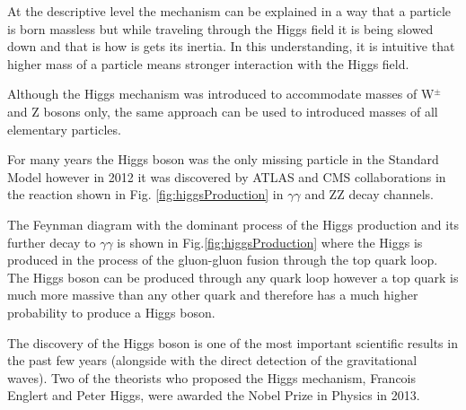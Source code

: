 At the descriptive level the mechanism can be explained in a way that a particle is born massless but while traveling through the Higgs field it is being slowed down and that is how is gets its inertia. In this understanding, it is intuitive that higher mass of a particle means stronger interaction with the Higgs field. 

Although the Higgs mechanism was introduced to accommodate masses of W$^\pm$ and Z bosons only, the same approach can be used to introduced masses of all elementary particles.

For many years the Higgs boson was the only missing particle in the Standard Model however in 2012 it was discovered by ATLAS and CMS collaborations in the reaction shown in Fig. \ref{fig:higgsProduction} in $\gamma\gamma$ and ZZ decay channels. 

The Feynman diagram with the dominant process of the Higgs production and its further decay to $\gamma\gamma$ is shown in Fig.\ref{fig:higgsProduction} where the Higgs is produced in the process of the gluon-gluon fusion through the top quark loop. The Higgs boson can be produced through any quark loop however a top quark is much more massive than any other quark and therefore has a much higher probability to produce a Higgs boson. 

The discovery of the Higgs boson is one of the most important scientific results in the past few years (alongside with the direct detection of the gravitational waves). Two of the theorists who proposed the Higgs mechanism, Francois Englert and Peter Higgs, were awarded the Nobel Prize in Physics in 2013.


